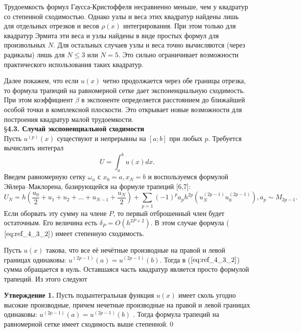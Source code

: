 Трудоемкость формул Гаусса-Кристоффеля несравненно меньше, чем у квадратур со
степенной сходимостью. Однако узлы и веса этих квадратур
найдены лишь для отдельных отрезков и весов $\rho(x)$ интегрирования. При этом
только для квадратур Эрмита эти веса и узлы найдены в виде простых формул
для произвольных $N$. Для остальных случаев узлы и веса точно вычисляются
(через радикалы) лишь для $N \leqslant 3$ или $N = 5$. Это сильно ограничивает
возможности практического использования таких квадратур.

Далее покажем, что если $u(x)$ четно продолжается через обе границы
отрезка, то формула трапеций на равномерной сетке дает экспоненциальную
сходимость. При этом коэффициент $\beta$ в экспоненте определяется расстоянием
до ближайшей особой точки в комплексной плоскости. Это открывает новые
возможности для построения квадратур малой трудоемкости.
\\

\S \textbf{4.3. Случай экспоненциальной сходимости}
\\

Пусть $u^{(p)}(x)$ существуют и непрерывны на $[a;b]$ при любых $p$. Требуется вычислить интеграл
\begin{equation}
U = \int_a^b u(x)dx.
\label{eq:ref_4_3_1}
\end{equation}
Введем равномерную сетку $\omega_n$ с $x_0=a,x_N=b$ и воспользуемся формулой
Эйлера–Маклорена, базирующейся на формуле трапеций [6,7]:
\begin{equation}
U_N=h(\frac{u_0}{2} + u_1 + u_2 + ... + u_{N-1} + \frac{u_N}{2}) + \sum_{p=1} (-1)^p a_p h^{2p}(u_N^{(2p-1)}u_0^{(2p-1)}),
a_p \sim M_{2p-1}.
\label{eq:ref_4_3_2}
\end{equation}
Если оборвать эту сумму на члене $P$, то первый отброшенный член будет
остаточным. Его величина есть $\delta_P=O(h^{2P+2})$. В этом случае формула ($\ref{eq:ref_4_3_2}$) имеет
степенную сходимость.

Пусть $u(x)$ такова, что все её нечётные производные на правой и левой
границах одинаковы: $u^{(2p-1)}(a)=u^{(2p-1)}(b)$. Тогда в ($\ref{eq:ref_4_3_2}$) сумма обращается в
нуль. Оставшаяся часть квадратур является просто формулой трапеций. Из
этого следуют

\textbf{Утверждение 1.} Пусть подынтегральная функция $u(x)$ имеет сколь
угодно высокие производные, причем нечетные производные на правой и левой
границах одинаковы: $u^{(2p-1)}(a)=u^{(2p-1)}(b)$ . Тогда формула трапеций на
равномерной сетке имеет сходимость выше степенной.\qed

